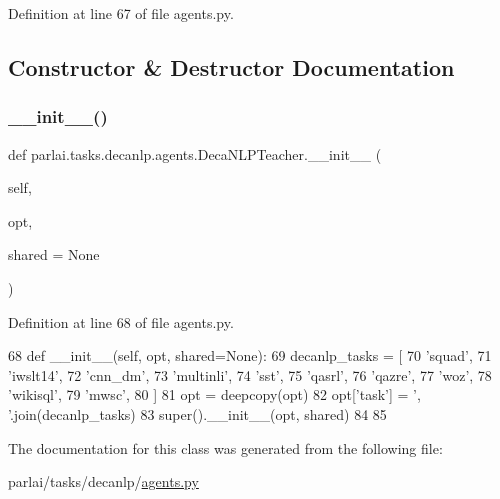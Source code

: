 Definition at line 67 of file agents.\+py.



\subsection{Constructor \& Destructor Documentation}
\mbox{\label{classparlai_1_1tasks_1_1decanlp_1_1agents_1_1DecaNLPTeacher_a2928fb06e1bf1f282b8019cc34e1d1ce}} 
\subsubsection{\texorpdfstring{\+\_\+\+\_\+init\+\_\+\+\_\+()}{\_\_init\_\_()}}
{\footnotesize\ttfamily def parlai.\+tasks.\+decanlp.\+agents.\+Deca\+N\+L\+P\+Teacher.\+\_\+\+\_\+init\+\_\+\+\_\+ (\begin{DoxyParamCaption}\item[{}]{self,  }\item[{}]{opt,  }\item[{}]{shared = {\ttfamily None} }\end{DoxyParamCaption})}



Definition at line 68 of file agents.\+py.


\begin{DoxyCode}
68     \textcolor{keyword}{def }\_\_init\_\_(self, opt, shared=None):
69         decanlp\_tasks = [
70             \textcolor{stringliteral}{'squad'},
71             \textcolor{stringliteral}{'iwslt14'},
72             \textcolor{stringliteral}{'cnn\_dm'},
73             \textcolor{stringliteral}{'multinli'},
74             \textcolor{stringliteral}{'sst'},
75             \textcolor{stringliteral}{'qasrl'},
76             \textcolor{stringliteral}{'qazre'},
77             \textcolor{stringliteral}{'woz'},
78             \textcolor{stringliteral}{'wikisql'},
79             \textcolor{stringliteral}{'mwsc'},
80         ]
81         opt = deepcopy(opt)
82         opt[\textcolor{stringliteral}{'task'}] = \textcolor{stringliteral}{', '}.join(decanlp\_tasks)
83         super().\_\_init\_\_(opt, shared)
84 
85 
\end{DoxyCode}


The documentation for this class was generated from the following file\+:\begin{DoxyCompactItemize}
\item 
parlai/tasks/decanlp/\hyperlink{parlai_2tasks_2decanlp_2agents_8py}{agents.\+py}\end{DoxyCompactItemize}
